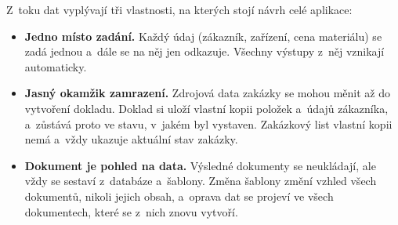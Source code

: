 Z~toku dat vyplývají tři vlastnosti, na kterých stojí návrh celé aplikace:

\begin{itemize}
\item \textbf{Jedno místo zadání.} Každý údaj (zákazník, zařízení, cena materiálu) se zadá jednou a~dále se na něj jen odkazuje. Všechny výstupy z~něj vznikají automaticky.
\item \textbf{Jasný okamžik zamrazení.} Zdrojová data zakázky se mohou měnit až do vytvoření dokladu. Doklad si uloží vlastní kopii položek a~údajů zákazníka, a~zůstává proto ve stavu, v~jakém byl vystaven. Zakázkový list vlastní kopii nemá a~vždy ukazuje aktuální stav zakázky.
\item \textbf{Dokument je pohled na data.} Výsledné dokumenty se neukládají, ale vždy se sestaví z~databáze a~šablony. Změna šablony změní vzhled všech dokumentů, nikoli jejich obsah, a~oprava dat se projeví ve všech dokumentech, které se z~nich znovu vytvoří.
\end{itemize}
